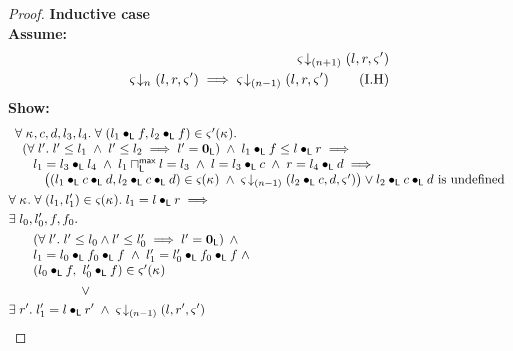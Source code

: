 \begin{lemma}[]
\begin{proof}
\noindent\textbf{Inductive case}\\
\textbf{Assume:}
%
\begin{align}
	\varsigma_{} \!\downarrow_{(n+1)} \left(l, r, \varsigma_{}'\right) \label{L9:Ass1}\\
	\varsigma_{} \!\downarrow_{n} \left(l, r, \varsigma_{}'\right) \implies \varsigma_{} \!\downarrow_{(n-1)} \left(l, r, \varsigma_{}'\right) \tag{I.H} \label{L9:I.H}
\end{align}
%
\textbf{Show:}
%
\begin{align}
	&\begin{array}{l}
			\for{\ca{}, c, d, l_3, l_4} \for{(l_1 \composeL f, l_2 \composeL f) \in \amod{}'(\ca{})} \\
%			
			\hspace*{0.2cm}\left(\for{l'} l' \leq l_1 \;\land\; l' \leq l_2 \implies l' = \unitL \right) \;\land\; l_1 \composeL f \leq l \composeL r \implies\\
%			
			\hspace*{0.5cm} l_1 = l_3 \composeL l_4 \;\land\; 	l_1 \maxMeetL l = l_3 \;\land\; l = l_3 \composeL c \;\land\; r = l_4 \composeL d \implies \\
%			
			\hspace*{0.8cm} \left((l_1 \composeL c \composeL d, l_2 \composeL c \composeL d) \in \amod{}(\ca{}) 
			\;\land\;
			\extendsAMUpto{\amod}{(n-1)}{l_2 \composeL c}{d}{\amod{}'}\right) \lor l_2 \composeL c \composeL d \text{ is undefined} 	
	\end{array}\label{L9:Goal1}\\
%
  &\for{\ca{}} \for{(l_1, l'_1) \in \amod{}(\ca{})} l_1 = l \composeL r \implies \nonumber\\
	&\exsts{l_0, l'_0, f, f_0} \nonumber\\
  &\hspace*{0.5cm}
  \begin{array}{l}
  	\left(\for{l'} l' \leq l_0 \land l' \leq l'_0 \implies l' = \unitL \right)\;\land\\
  	l_1 = l_0 \composeL f_0 \composeL f \;\land\; l'_1 = l'_0 \composeL f_0 \composeL f \;\land\\
  	(l_0 \composeL f,\ l'_0 \composeL f) \in \amod{}'(\ca{}) 
  \end{array} \nonumber\\
%
	&\hspace*{2cm}\lor  \nonumber\\
	&\exsts{r'} l'_1 = l \composeL r' \;\land\; \extendsAMUpto{\amod}{(n-1)}{l}{r'}{\amod{}'} \label{L9:Goal2}
\end{align}
%


\end{proof}
\end{lemma}
